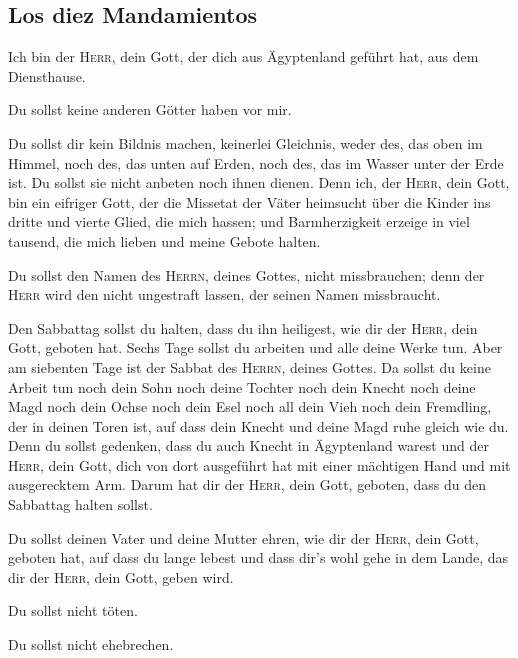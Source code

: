 \hypertarget{los-diez-mandamientos}{%
\subsection{Los diez Mandamientos}\label{los-diez-mandamientos}}

 Ich bin der \textsc{Herr}, dein Gott, der dich aus
Ägyptenland geführt hat, aus dem Diensthause.

 Du sollst keine anderen Götter haben vor mir.

 Du sollst dir kein Bildnis machen, keinerlei Gleichnis,
weder des, das oben im Himmel, noch des, das unten auf Erden, noch des,
das im Wasser unter der Erde ist.  Du sollst sie nicht
anbeten noch ihnen dienen. Denn ich, der \textsc{Herr}, dein Gott, bin
ein eifriger Gott, der die Missetat der Väter heimsucht über die Kinder
ins dritte und vierte Glied, die mich hassen;  und
Barmherzigkeit erzeige in viel tausend, die mich lieben und meine Gebote
halten.

 Du sollst den Namen des \textsc{Herrn}, deines Gottes,
nicht missbrauchen; denn der \textsc{Herr} wird den nicht ungestraft
lassen, der seinen Namen missbraucht.

 Den Sabbattag sollst du halten, dass du ihn heiligest,
wie dir der \textsc{Herr}, dein Gott, geboten hat.  Sechs
Tage sollst du arbeiten und alle deine Werke tun.  Aber
am siebenten Tage ist der Sabbat des \textsc{Herrn}, deines Gottes. Da
sollst du keine Arbeit tun noch dein Sohn noch deine Tochter noch dein
Knecht noch deine Magd noch dein Ochse noch dein Esel noch all dein Vieh
noch dein Fremdling, der in deinen Toren ist, auf dass dein Knecht und
deine Magd ruhe gleich wie du.  Denn du sollst gedenken,
dass du auch Knecht in Ägyptenland warest und der \textsc{Herr}, dein
Gott, dich von dort ausgeführt hat mit einer mächtigen Hand und mit
ausgerecktem Arm. Darum hat dir der \textsc{Herr}, dein Gott, geboten,
dass du den Sabbattag halten sollst.

 Du sollst deinen Vater und deine Mutter ehren, wie dir
der \textsc{Herr}, dein Gott, geboten hat, auf dass du lange lebest und
dass dir's wohl gehe in dem Lande, das dir der \textsc{Herr}, dein Gott,
geben wird.

 Du sollst nicht töten.

 Du sollst nicht ehebrechen.

